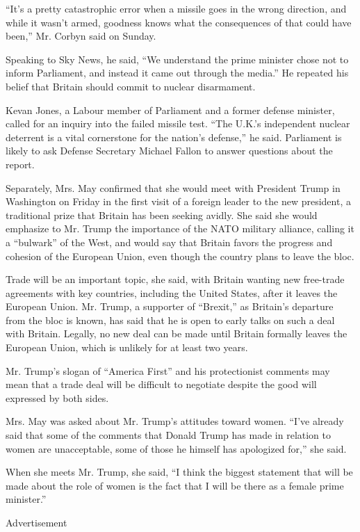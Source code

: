 ``It's a pretty catastrophic error when a missile goes in the wrong
direction, and while it wasn't armed, goodness knows what the
consequences of that could have been,'' Mr. Corbyn said on Sunday.

Speaking to Sky News, he said, ``We understand the prime minister chose
not to inform Parliament, and instead it came out through the media.''
He repeated his belief that Britain should commit to nuclear
disarmament.

Kevan Jones, a Labour member of Parliament and a former defense
minister, called for an inquiry into the failed missile test. ``The
U.K.'s independent nuclear deterrent is a vital cornerstone for the
nation's defense,'' he said. Parliament is likely to ask Defense
Secretary Michael Fallon to answer questions about the report.

Separately, Mrs. May confirmed that she would meet with President Trump
in Washington on Friday in the first visit of a foreign leader to the
new president, a traditional prize that Britain has been seeking avidly.
She said she would emphasize to Mr. Trump the importance of the NATO
military alliance, calling it a ``bulwark'' of the West, and would say
that Britain favors the progress and cohesion of the European Union,
even though the country plans to leave the bloc.

Trade will be an important topic, she said, with Britain wanting new
free-trade agreements with key countries, including the United States,
after it leaves the European Union. Mr. Trump, a supporter of
``Brexit,'' as Britain's departure from the bloc is known, has said that
he is open to early talks on such a deal with Britain. Legally, no new
deal can be made until Britain formally leaves the European Union, which
is unlikely for at least two years.

Mr. Trump's slogan of ``America First'' and his protectionist comments
may mean that a trade deal will be difficult to negotiate despite the
good will expressed by both sides.

Mrs. May was asked about Mr. Trump's attitudes toward women. ``I've
already said that some of the comments that Donald Trump has made in
relation to women are unacceptable, some of those he himself has
apologized for,'' she said.

When she meets Mr. Trump, she said, ``I think the biggest statement that
will be made about the role of women is the fact that I will be there as
a female prime minister.''

Advertisement

